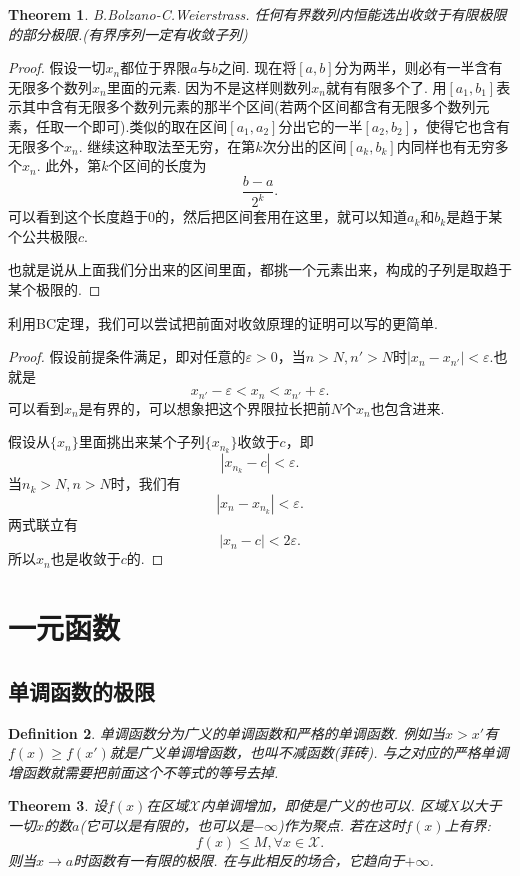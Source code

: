 \documentclass{article}
\newtheorem{theorem}{Theorem}[section]
\newtheorem{definition}[theorem]{Definition}
\begin{document}
\begin{theorem}
B.Bolzano-C.Weierstrass. 任何有界数列内恒能选出收敛于有限极限的部分极限.(有界序列一定有收敛子列)
\end{theorem}

\begin{proof}
假设一切$x_n$都位于界限$a$与$b$之间. 现在将$[a,b]$分为两半，则必有一半含有无限多个数列$x_n$里面的元素. 因为不是这样则数列$x_n$就有有限多个了. 用$[a_1,b_1]$表示其中含有无限多个数列元素的那半个区间(若两个区间都含有无限多个数列元素，任取一个即可).类似的取在区间$[a_1,a_2]$分出它的一半$[a_2,b_2]$，使得它也含有无限多个$x_n$. 继续这种取法至无穷，在第$k$次分出的区间$[a_k,b_k]$内同样也有无穷多个$x_n$. 此外，第$k$个区间的长度为\[\frac{b-a}{2^k}.\]可以看到这个长度趋于$0$的，然后把区间套用在这里，就可以知道$a_k$和$b_k$是趋于某个公共极限$c$.

也就是说从上面我们分出来的区间里面，都挑一个元素出来，构成的子列是取趋于某个极限的.
\end{proof}

利用BC定理，我们可以尝试把前面对收敛原理的证明可以写的更简单.

\begin{proof}
假设前提条件满足，即对任意的$\varepsilon > 0$，当$n > N,n'>N$时$|x_n-x_{n'}|< \varepsilon$.也就是\[ x_{n'} -\varepsilon < x_n < x_{n'} + \varepsilon.\]可以看到$x_n$是有界的，可以想象把这个界限拉长把前$N$个$x_n$也包含进来.

假设从$\{x_n\}$里面挑出来某个子列$\{x_{n_k}\}$收敛于$c$，即\[|x_{n_k} -c| < \varepsilon.\]当$n_k > N,n > N$时，我们有\[|x_n - x_{n_k}| < \varepsilon.\]两式联立有\[|x_n - c| < 2\varepsilon.\]所以$x_n$也是收敛于$c$的.
\end{proof}



\newpage
\section{一元函数}
\subsection{单调函数的极限}

\begin{definition}
\rm 单调函数分为广义的单调函数和严格的单调函数. 例如当$x > x'$有$f(x) \geq f(x')$就是广义单调增函数，也叫不减函数(菲砖). 与之对应的严格单调增函数就需要把前面这个不等式的等号去掉.
\end{definition}


\begin{theorem}
\rm 设$f(x)$在区域$\mathcal{X}$内单调增加，即使是广义的也可以. 区域$X$以大于一切$x$的数$a$(它可以是有限的，也可以是$-\infty$)作为聚点. 若在这时$f(x)$上有界:
$$
	f(x) \leq M , \forall x \in \mathcal{X}.
$$
则当$x \rightarrow a$时函数有一有限的极限. 在与此相反的场合，它趋向于$+\infty$.
\end{theorem}
\end{document}

